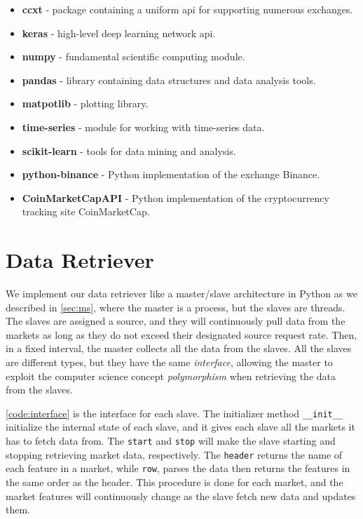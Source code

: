 \begin{itemize}
    \item \textbf{ccxt} - package containing a uniform \ac{api} for supporting numerous exchanges.
    \item \textbf{keras} - high-level deep learning network \ac{api}.
    \item \textbf{numpy} - fundamental scientific computing module.
    \item \textbf{pandas} - library containing data structures and data analysis tools.
    \item \textbf{matpotlib} - plotting library.
    \item \textbf{time-series} - module for working with time-series data.  
    \item \textbf{scikit-learn} - tools for data mining and analysis.
    \item \textbf{python-binance} - Python implementation of the exchange Binance.
    \item \textbf{CoinMarketCapAPI} - Python implementation of the cryptocurrency tracking site CoinMarketCap.
\end{itemize}

\section{Data Retriever}
We implement our data retriever like a master/slave architecture in Python as we described in \autoref{sec:ms}, where the master is a process, but the slaves are threads. The slaves are assigned a source, and they will continuously pull data from the markets as long as they do not exceed their designated source request rate. Then, in a fixed interval, the master collects all the data from the slaves. All the slaves are different types, but they have the same \emph{interface}, allowing the master to exploit the computer science concept \emph{polymorphism} when retrieving the data from the slaves. 

\autoref{code:interface} is the interface for each slave. The initializer method \texttt{\_\_init\_\_} initialize the internal state of each slave, and it gives each slave all the markets it has to fetch data from. The \texttt{start} and \texttt{stop} will make the slave starting and stopping retrieving market data, respectively. The \texttt{header} returns the name of each feature in a market, while \texttt{row}, parses the data then returns the features in the same order as the header. This procedure is done for each market, and the market features will continuously change as the slave fetch new data and updates them.

